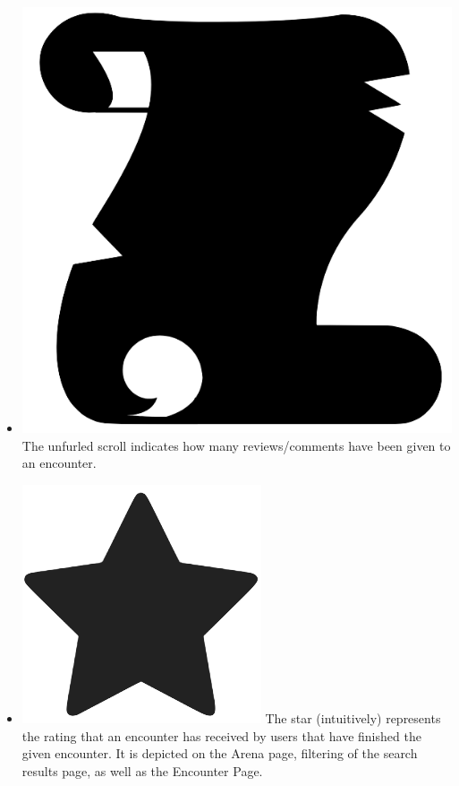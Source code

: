 \documentclass[12pt,a4paper]{report}
\begin{document}
\begin{itemize}
		\item \includegraphics[scale=.03]{scroll}
		The unfurled scroll indicates how many reviews/comments have been given to an encounter.
		\item \includegraphics[scale=.07]{rating_icon}
		The star (intuitively) represents the rating that an encounter has received by users that have finished the given encounter. It is depicted on the Arena page, filtering of the search results page, as well as the Encounter Page.

\end{itemize}
\end{document}
